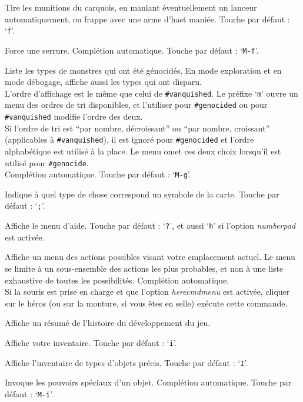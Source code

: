\documentclass[titlepage]{article}
\begin{document}
\begin{description}[font=\mdseries\ttfamily]
Tire les munitions du carquois, en maniant éventuellement un lanceur automatiquement,
ou frappe avec une arme d'hast maniée.
Touche par défaut : `\texttt{f}'.
\item[\#force]
Force une serrure. Complétion automatique. Touche par défaut : `\texttt{M-f}'.
\item[\#genocided]
Liste les types de monstres qui ont été génocidés.
En mode exploration et en mode débogage, affiche aussi les types qui ont
disparu.
\\
L'ordre d'affichage est le même que celui de \texttt{\#vanquished}.
Le préfixe `\texttt{m}' ouvre un menu des ordres de tri disponibles, et
l'utiliser pour \texttt{\#genocided} ou pour \texttt{\#vanquished} modifie l'ordre des deux.
\\
Si l'ordre de tri est ``par nombre, décroissant'' ou ``par nombre, croissant''
(applicables à \texttt{\#vanquished}), il est ignoré
pour \texttt{\#genocided} et l'ordre alphabétique est utilisé à la place.
Le menu omet ces deux choix lorsqu'il est utilisé pour \texttt{\#genocide}.
\\
Complétion automatique.
Touche par défaut : `\texttt{M-g}'.
\item[\#glance]
Indique à quel type de chose correspond un symbole de la carte. Touche par défaut : `\texttt{;}'.
\item[\#help]
Affiche le menu d'aide.
Touche par défaut : `\texttt{?}',
et aussi `\texttt{h}' si l'option \textit{number\textunderscore pad} est activée.
\item[\#herecmdmenu]
Affiche un menu des actions possibles visant votre emplacement actuel.
Le menu se limite à un sous-ensemble des actions les plus probables, et non à
une liste exhaustive de toutes les possibilités.
Complétion automatique.\\
Si la souris est prise en charge et que l'option \textit{herecmd\textunderscore menu}
est activée, cliquer sur le héros (ou sur la monture, si vous êtes en selle)
exécute cette commande.
\item[\#history]
Affiche un résumé de l'histoire du développement du jeu.
\item[\#inventory]
Affiche votre inventaire. Touche par défaut : `\texttt{i}'.
\item[\#inventtype]
Affiche l'inventaire de types d'objets précis. Touche par défaut : `\texttt{I}'.
\item[\#invoke]
Invoque les pouvoirs spéciaux d'un objet. Complétion automatique. Touche par défaut : `\texttt{M-i}'.

\end{description}
\end{document}
